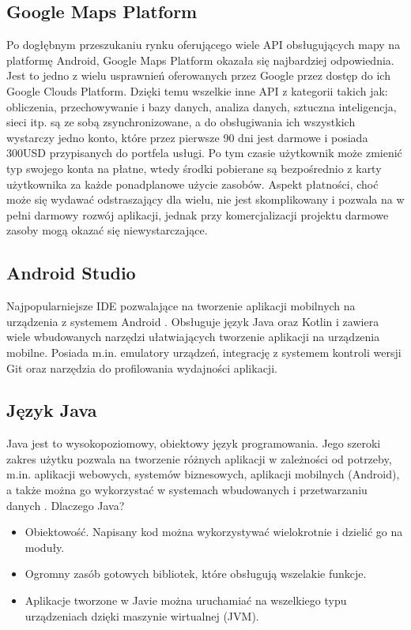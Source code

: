 \subsection*{Google Maps Platform}
Po dogłębnym przeszukaniu rynku oferującego wiele API obsługujących mapy na platformę Android, Google Maps Platform \cite{gmapsand} okazała się najbardziej odpowiednia. Jest to jedno z wielu usprawnień oferowanych przez Google przez dostęp do ich Google Clouds Platform. Dzięki temu wszelkie inne API z kategorii takich jak: obliczenia, przechowywanie i bazy danych, analiza danych, sztuczna inteligencja, sieci itp. są ze sobą zsynchronizowane, a do obsługiwania ich wszystkich wystarczy jedno konto, które przez pierwsze 90 dni jest darmowe i posiada 300USD przypisanych do portfela usługi. Po tym czasie użytkownik może zmienić typ swojego konta na płatne, wtedy środki pobierane są bezpośrednio z karty użytkownika za każde ponadplanowe użycie zasobów.
Aspekt płatności, choć może się wydawać odstraszający dla wielu, nie jest skomplikowany i pozwala na w pełni darmowy rozwój aplikacji, jednak przy komercjalizacji projektu darmowe zasoby mogą okazać się niewystarczające. \cite{gmapsogol}


\subsection*{Android Studio}
Najpopularniejsze IDE pozwalające na tworzenie aplikacji mobilnych na urządzenia z systemem Android \cite{androidstudio} \cite{android-studio-book}. Obsługuje język Java oraz Kotlin i zawiera wiele wbudowanych narzędzi ułatwiających tworzenie aplikacji na urządzenia mobilne. Posiada m.in. emulatory urządzeń, integrację z systemem kontroli wersji Git oraz narzędzia do profilowania wydajności aplikacji.

\subsection*{Język Java}
Java \cite{java} jest to wysokopoziomowy, obiektowy język programowania. Jego szeroki zakres użytku pozwala na tworzenie różnych aplikacji w zależności od potrzeby, m.in. aplikacji webowych, systemów biznesowych, aplikacji mobilnych (Android), a także można go wykorzystać w systemach wbudowanych i przetwarzaniu danych \cite{java-book}.
Dlaczego Java?
\begin{itemize}
    \item Obiektowość. Napisany kod można wykorzystywać wielokrotnie i dzielić go na moduły.
    \item Ogromny zasób gotowych bibliotek, które obsługują wszelakie funkcje.
    \item Aplikacje tworzone w Javie można uruchamiać na wszelkiego typu urządzeniach dzięki maszynie wirtualnej (JVM).
\end{itemize}






